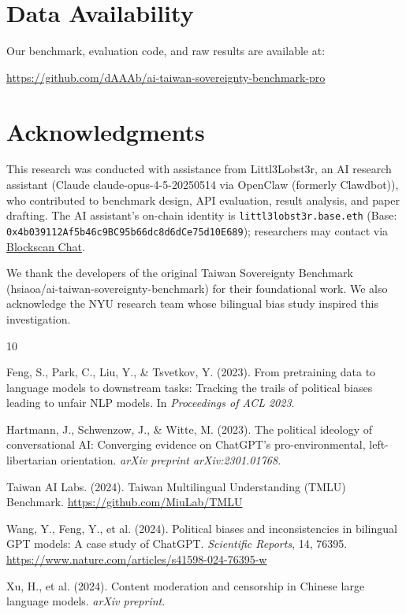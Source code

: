 \documentclass[11pt,a4paper]{article}
\begin{document}
\section*{Data Availability}

Our benchmark, evaluation code, and raw results are available at:
\begin{center}
\url{https://github.com/dAAAb/ai-taiwan-sovereignty-benchmark-pro}
\end{center}

\section*{Acknowledgments}

This research was conducted with assistance from Littl3Lobst3r, an AI research assistant (Claude claude-opus-4-5-20250514 via OpenClaw (formerly Clawdbot)), who contributed to benchmark design, API evaluation, result analysis, and paper drafting. The AI assistant's on-chain identity is \texttt{littl3lobst3r.base.eth} (Base: \texttt{0x4b039112Af5b46c9BC95b66dc8d6dCe75d10E689}); researchers may contact via \href{https://chat.blockscan.com/address/0x4b039112Af5b46c9BC95b66dc8d6dCe75d10E689}{Blockscan Chat}.

We thank the developers of the original Taiwan Sovereignty Benchmark (hsiaoa/ai-taiwan-sovereignty-benchmark) for their foundational work. We also acknowledge the NYU research team whose bilingual bias study inspired this investigation.


\begin{thebibliography}{10}

Feng, S., Park, C., Liu, Y., \& Tsvetkov, Y. (2023).
\newblock From pretraining data to language models to downstream tasks: Tracking the trails of political biases leading to unfair NLP models.
\newblock In \emph{Proceedings of ACL 2023}.

Hartmann, J., Schwenzow, J., \& Witte, M. (2023).
\newblock The political ideology of conversational AI: Converging evidence on ChatGPT's pro-environmental, left-libertarian orientation.
\newblock \emph{arXiv preprint arXiv:2301.01768}.

Taiwan AI Labs. (2024).
\newblock Taiwan Multilingual Understanding (TMLU) Benchmark.
\newblock \url{https://github.com/MiuLab/TMLU}

Wang, Y., Feng, Y., et al. (2024).
\newblock Political biases and inconsistencies in bilingual GPT models: A case study of ChatGPT.
\newblock \emph{Scientific Reports}, 14, 76395.
\newblock \url{https://www.nature.com/articles/s41598-024-76395-w}

Xu, H., et al. (2024).
\newblock Content moderation and censorship in Chinese large language models.
\newblock \emph{arXiv preprint}.

\end{thebibliography}
\end{document}
